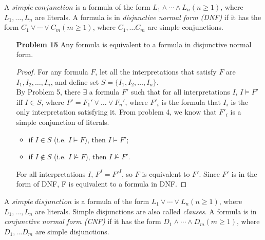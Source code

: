\noindent
A $simple~ conjunction$ is a formula of the form $L_1 \wedge \cdots \wedge L_n (n \geq 1)$, where $L_1, \ldots, L_n$ are literals. A formula is in \textit{disjunctive normal form (DNF)} if it has the form $C_1 \vee \cdots \vee C_m (m \geq 1)$, where $C_1, \ldots C_m$ are simple conjunctions. 

\begin{enumerate}
\item[\textbf{Problem 15}] Any formula is equivalent to a formula in disjunctive normal form. 
\begin{proof}
For any formula $F$, let all the interpretations that satisfy $F$ are $I_1, I_2, \ldots, I_n$, and define set $S = \{I_1, I_2, \ldots, I_n\}$. \\
By Problem 5, there $\exists$ a formula $F'$ such that for all interpretations $I$, $I \models F'$ iff $I \in S$, where $F' = F_1' \vee \ldots \vee F_n'$, where $F'_i$ is the formula that $I_i$ is the only interpretation satisfying it. From problem 4, we know that $F'_i$ is a simple conjunction of literals. 
\begin{itemize}
	\item if $I \in S$ (i.e. $I \models F$), then $I \models F'$;
	\item if $I \notin S$ (i.e. $I \nvDash F$), then $I \nvDash F'$.
\end{itemize}

For all interpretations $I$, $F^I = F'^{I}$, so $F$ is equivalent to $F'$. Since $F'$ is in the form of DNF, F is equivalent to a formula in DNF.
\end{proof}

\end{enumerate}

\noindent
A $simple~ disjunction$ is a formula of the form $L_1 \vee \cdots \vee L_n (n \geq 1)$, where $L_1, \ldots, L_n$ are literals. Simple disjunctions are also called \textit{clauses}. 
\noindent
A formula is in \textit{conjunctive normal form (CNF)} if it has the form $D_1 \wedge \cdots \wedge D_m (m \geq 1)$, where $D_1, \ldots D_m$ are simple disjunctions. 

